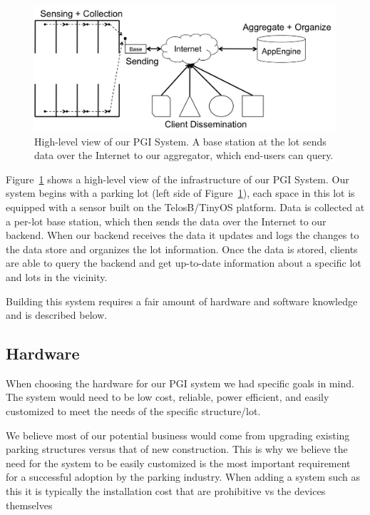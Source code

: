 \documentclass{acm_proc}
\begin{document}
\begin{figure}
    \begin{center}
		\includegraphics[width=\columnwidth]{figures/high-level}
	\end{center}
	\caption{High-level view of our PGI System. A base station at the lot
	sends data over the Internet to our aggregator, which end-users can
	query.}
	\label{fig:high-level}
\end{figure}

Figure~\ref{fig:high-level} shows a high-level view of the infrastructure
of our PGI System.
Our system begins with a parking lot (left side of
Figure~\ref{fig:high-level}), each space in this lot is equipped with a
sensor built on the TelosB/TinyOS platform.
Data is collected at a per-lot base station, which then sends the data over
the Internet to our backend.
When our backend receives the data it updates and logs the changes to the
data store and organizes the lot information.
Once the data is stored, clients are able to query the backend and get
up-to-date information about a specific lot and lots in the vicinity.

Building this system requires a fair amount of hardware and software
knowledge and is described below.

\subsection{Hardware}
When choosing the hardware for our PGI system we had specific goals in mind.  The system would need to be low cost, reliable, power efficient, and easily customized to meet the needs of the specific structure/lot.  

We believe most of our potential business would come from upgrading existing parking structures versus that of new construction.  This is why we believe the need for the system to be easily customized is the most important requirement for a successful adoption by the parking industry.  When adding a system such as this it is typically the installation cost that are prohibitive vs the devices themselves 
\end{document}
